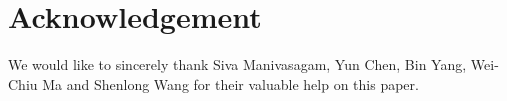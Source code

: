 
\section*{Acknowledgement}
We would like to sincerely thank Siva Manivasagam, Yun Chen, Bin Yang, Wei-Chiu Ma and
Shenlong Wang for their valuable help on this paper.

